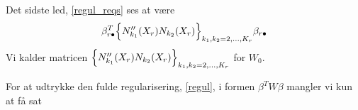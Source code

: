 \documentclass[a4paper, 12pt]{memoir}
\begin{document}
Det sidste led, \eqref{regul_reqs} ses at være
\begin{equation}
\beta_{r\bullet}^T \Bigl\{N_{k_1}''(X_r)N_{k_2}(X_r)\Bigr\}_{k_1,k_2=2, \dots, K_r} \beta_{r\bullet}
\end{equation}
Vi kalder matricen $\Bigl\{N_{k_1}''(X_r)N_{k_2}(X_r)\Bigr\}_{k_1,k_2=2, \dots, K_r}$ for $W_0$. 



For at udtrykke den fulde regularisering, \eqref{regul}, i formen $\beta^TW\beta$ mangler vi kun at få sat 
\end{document}
